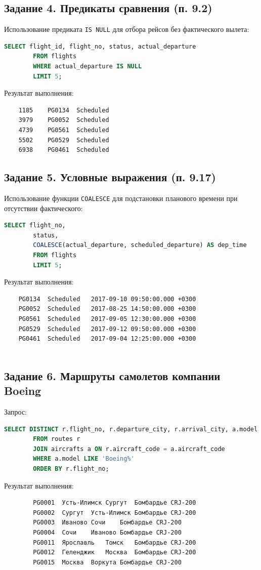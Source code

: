 \documentclass{bmstu-sob}
\begin{document}
	\subsection{Задание 4. Предикаты сравнения (п. 9.2)}
	Использование предиката \texttt{IS NULL} для отбора рейсов без фактического вылета:
	\begin{lstlisting}[language=SQL]
		SELECT flight_id, flight_no, status, actual_departure
		FROM flights
		WHERE actual_departure IS NULL
		LIMIT 5;
	\end{lstlisting}
	Результат выполнения:
	\begin{lstlisting}
	1185	PG0134	Scheduled	
	3979	PG0052	Scheduled	
	4739	PG0561	Scheduled	
	5502	PG0529	Scheduled	
	6938	PG0461	Scheduled	
	\end{lstlisting}
	
	\subsection{Задание 5. Условные выражения (п. 9.17)}
	Использование функции \texttt{COALESCE} для подстановки планового времени при отсутствии фактического:
	\begin{lstlisting}[language=SQL]
		SELECT flight_no,
		status,
		COALESCE(actual_departure, scheduled_departure) AS dep_time
		FROM flights
		LIMIT 5;
	\end{lstlisting}
	Результат выполнения:
	\begin{lstlisting}
	PG0134	Scheduled	2017-09-10 09:50:00.000 +0300
	PG0052	Scheduled	2017-08-25 14:50:00.000 +0300
	PG0561	Scheduled	2017-09-05 12:30:00.000 +0300
	PG0529	Scheduled	2017-09-12 09:50:00.000 +0300
	PG0461	Scheduled	2017-09-04 12:25:00.000 +0300
	
	\end{lstlisting}
	
	\subsection{Задание 6. Маршруты самолетов компании Boeing}
	Запрос:
	\begin{lstlisting}[language=SQL]
		SELECT DISTINCT r.flight_no, r.departure_city, r.arrival_city, a.model
		FROM routes r
		JOIN aircrafts a ON r.aircraft_code = a.aircraft_code
		WHERE a.model LIKE 'Boeing%'
		ORDER BY r.flight_no;
	\end{lstlisting}
	Результат выполнения:
	\begin{lstlisting}
		PG0001	Усть-Илимск	Сургут	Бомбардье CRJ-200
		PG0002	Сургут	Усть-Илимск	Бомбардье CRJ-200
		PG0003	Иваново	Сочи	Бомбардье CRJ-200
		PG0004	Сочи	Иваново	Бомбардье CRJ-200
		PG0011	Ярославль	Томск	Бомбардье CRJ-200
		PG0012	Геленджик	Москва	Бомбардье CRJ-200
		PG0015	Москва	Воркута	Бомбардье CRJ-200
		
	\end{lstlisting}
	
\end{document}
